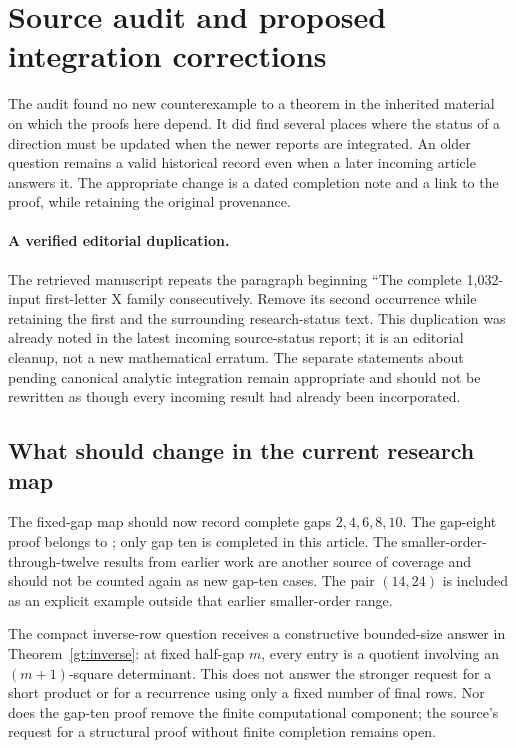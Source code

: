 \section{Source audit and proposed integration corrections}
\label{audit:section}

The audit found no new counterexample to a theorem in the inherited
material on which the proofs here depend. It did find several places
where the status of a direction must be updated when the newer reports
are integrated. An older question remains a valid historical record
even when a later incoming article answers it. The appropriate change
is a dated completion note and a link to the proof, while retaining
the original provenance.

\paragraph{A verified editorial duplication.}
The retrieved manuscript  repeats the paragraph beginning
``The complete 1,032-input first-letter X family consecutively.
Remove its second occurrence while retaining the first and the surrounding
research-status text. This duplication was already noted in the latest
incoming source-status report; it is an editorial cleanup, not a new
mathematical erratum. The separate statements about pending canonical
analytic integration remain appropriate and should not be rewritten as
though every incoming result had already been incorporated.

\subsection{What should change in the current research map}

The fixed-gap map should now record complete gaps $2,4,6,8,10$.
The gap-eight proof belongs to \cite{PolygammaResonances}; only gap ten
is completed in this article. The smaller-order-through-twelve results
from earlier work are another source of coverage and should not be
counted again as new gap-ten cases. The pair $(14,24)$ is included as
an explicit example outside that earlier smaller-order range.

The compact inverse-row question receives a constructive bounded-size
answer in Theorem~\ref{gt:inverse}: at fixed half-gap $m$, every entry
is a quotient involving an $(m+1)$-square determinant. This does not
answer the stronger request for a short product or for a recurrence
using only a fixed number of final rows. Nor does the gap-ten proof
remove the finite computational component; the source's request for
a structural proof without finite completion remains open.

